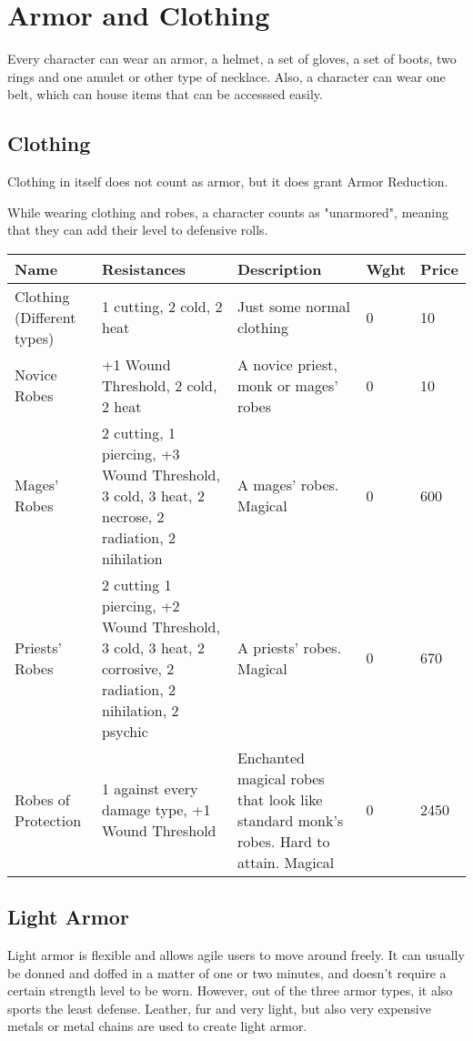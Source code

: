 \section{Armor and Clothing}
Every character can wear an armor, a helmet, a set of gloves, a set of boots, two rings and one amulet or other type of necklace. Also, a character can wear one belt, which can house items that can be accesssed easily.

\subsection{Clothing}

Clothing in itself does not count as armor, but it does grant Armor Reduction.

While wearing clothing and robes, a character counts as "unarmored", meaning that they can add their level to defensive rolls.


\begin{longtable}{p{1.5cm} | p{4cm} | p{2.5cm} | p{1cm} | p{1.5cm}}
	Name & Resistances & Description & Wght & Price\\ \hline
	Clothing (Different types) & 1 cutting, 2 cold, 2 heat & Just some normal clothing & 0 & 10\\
	
	Novice Robes & +1 Wound Threshold, 2 cold, 2 heat & A novice priest, monk or mages' robes & 0 & 10\\
	
	Mages' Robes & 2 cutting, 1 piercing, +3 Wound Threshold, 3 cold, 3 heat, 2 necrose, 2 radiation, 2 nihilation & A mages' robes. Magical & 0 & 600\\
	
	Priests' Robes & 2 cutting 1 piercing, +2 Wound Threshold, 3 cold, 3 heat, 2 corrosive, 2 radiation, 2 nihilation, 2 psychic & A priests' robes. Magical & 0 & 670\\
	
	Robes of Protection & 1 against every damage type, +1 Wound Threshold & Enchanted magical robes that look like standard monk's robes. Hard to attain. Magical & 0 & 2450\\
\end{longtable}


\subsection{Light Armor}

Light armor is flexible and allows agile users to move around freely. It can usually be donned and doffed in a matter of one or two minutes, and doesn't require a certain strength level to be worn. However, out of the three armor types, it also sports the least defense. Leather, fur and very light, but also very expensive metals or metal chains are used to create light armor.


